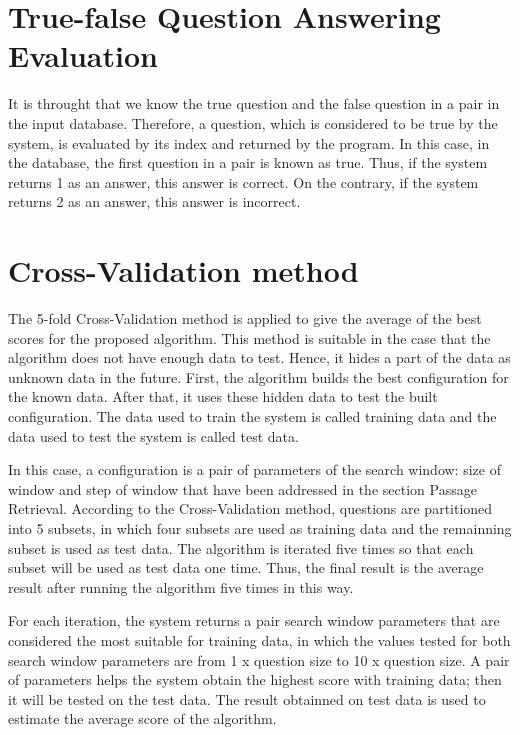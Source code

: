 \section{True-false Question Answering Evaluation}

It is throught that we know the true question and the false question in a pair in the input database. Therefore, a question, which is considered to be true by the system, is evaluated by its index and returned by the program. In this case, in the database, the first question in a pair is known as true.  Thus, if the system returns 1 as an answer, this answer is correct. On the contrary, if the system returns 2 as an answer, this answer is incorrect.




\section{Cross-Validation method}
 
 The 5-fold Cross-Validation method \cite{kohavi1995scv} is applied to give the average of the best scores for the proposed algorithm. This method is suitable in the case that the algorithm does not have enough data to test. Hence, it hides a part of the data as unknown data in the future. First, the algorithm builds the best configuration for the known data. After that, it uses these hidden data to test the built configuration. The data used to train the system is called training data and the data used to test the system is called test data.
 
In this case, a configuration is a pair of parameters of the search window: size of window and step of window that have been addressed in the section Passage Retrieval. According to the Cross-Validation method, questions are partitioned into 5 subsets, in which four subsets are used as training data and the remainning subset is used as test data. The algorithm is iterated five times so that each subset will be used as test data one time. Thus, the final result is the average result after running the algorithm five times in this way.

For each iteration, the system returns a pair search window parameters that are considered the most suitable for training data, in which the values tested for both search window parameters are  from 1 x question size to 10 x question size. A pair of parameters helps the system obtain the highest score with training data; then it will be tested on the test data. The result obtainned on test data is used to estimate the average score of the algorithm.



